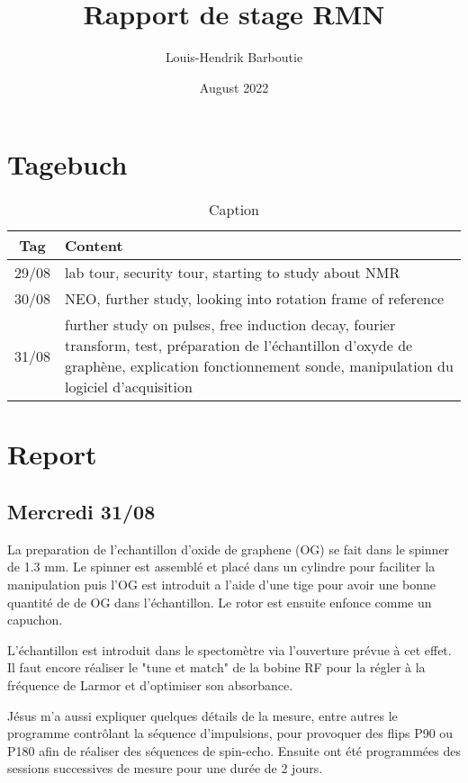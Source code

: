 \documentclass{article}
\title{Rapport de stage RMN}
\author{Louis-Hendrik Barboutie}
\date{August 2022}
\begin{document}
\maketitle

\section{Tagebuch}

\begin{table}[!ht]
    \centering
    \begin{tabular}{|c|l|} \hline
        Tag & Content \\ \hline
         29/08 & lab tour, security tour, starting to study about NMR \\
         30/08 & NEO, further study, looking into rotation frame of reference \\
         31/08 & further study on pulses, free induction decay, fourier transform, test, préparation de l'échantillon d'oxyde de graphène, explication fonctionnement sonde, manipulation du logiciel d'acquisition
    \end{tabular}
    \caption{Caption}
    \label{tab:my_label}
\end{table}

\section{Report}

\subsection{Mercredi 31/08}

La preparation de l'echantillon d'oxide de graphene (OG) se fait dans le spinner de 1.3 mm. Le spinner est assemblé et placé dans un cylindre pour faciliter la manipulation puis l'OG est introduit a l'aide d'une tige pour avoir une bonne quantité de de OG dans l'échantillon. Le rotor est ensuite enfonce comme un capuchon.

L'échantillon est introduit dans le spectomètre via l'ouverture prévue à cet effet. Il faut encore réaliser le "tune et match" de la bobine RF pour la régler à la fréquence de Larmor et d'optimiser son absorbance.

Jésus m'a aussi expliquer quelques détails de la mesure, entre autres le programme contrôlant la séquence d'impulsions, pour provoquer des flips P90 ou P180 afin de réaliser des séquences de spin-echo. Ensuite ont été programmées des sessions successives de mesure pour une durée de 2 jours.
\end{document}
